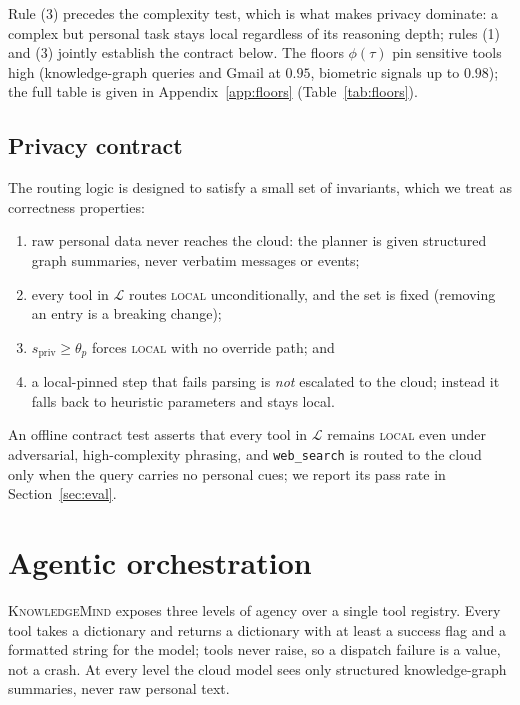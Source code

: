 \documentclass{ecai}
\newcommand{\km}{\textsc{KnowledgeMind}}
\begin{document}
Rule (3) precedes the complexity test, which is what makes privacy dominate: a
complex but personal task stays local regardless of its reasoning depth; rules
(1) and (3) jointly establish the contract below. The floors $\phi(\tau)$ pin
sensitive tools high (knowledge-graph queries and Gmail at $0.95$, biometric
signals up to $0.98$); the full table is given in Appendix~\ref{app:floors}
(Table~\ref{tab:floors}).

\subsection{Privacy contract}

The routing logic is designed to satisfy a small set of invariants, which we
treat as correctness properties:
%
\begin{enumerate}[label=(P\arabic*),noitemsep]
  \item raw personal data never reaches the cloud: the planner is given
        structured graph summaries, never verbatim messages or events;
  \item every tool in $\mathcal{L}$ routes \textsc{local} unconditionally, and
        the set is fixed (removing an entry is a breaking change);
  \item $s_{\mathrm{priv}}\ge\theta_p$ forces \textsc{local} with no override
        path; and
  \item a local-pinned step that fails parsing is \emph{not} escalated to the
        cloud; instead it falls back to heuristic parameters and stays local.
\end{enumerate}
%
An offline contract test asserts that every tool in $\mathcal{L}$ remains
\textsc{local} even under adversarial, high-complexity phrasing, and
\texttt{web\_search} is routed to the cloud only when the query carries no
personal cues; we report its pass rate in Section~\ref{sec:eval}.


\section{Agentic orchestration}\label{sec:agent}

\km{} exposes three levels of agency over a single tool registry. Every tool
takes a dictionary and returns a dictionary with at least a success flag and a
formatted string for the model; tools never raise, so a dispatch failure is a
value, not a crash. At every level the cloud model sees only structured
knowledge-graph summaries, never raw personal text.
\end{document}

